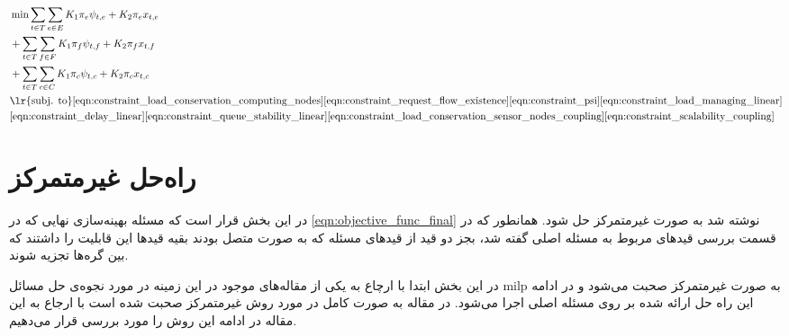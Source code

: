 	\begin{align}
		&\min \sum_{t \in T}\sum_{e \in E} K_1\pi_e\psi_{t,e}+K_2\pi_ex_{t,e}\notag \\
		&+\sum_{t \in T}\sum_{f \in F} K_1\pi_f\psi_{t,f}+K_2\pi_fx_{t,f}\notag \\
		&+\sum_{t \in T}\sum_{c \in C} K_1\pi_c\psi_{t,c}+K_2\pi_cx_{t,c} \label{eqn:objective_func_final} \notag \\
		&\text{\lr{subj. to}}  %
		\cref{eqn:constraint_load_conservation_computing_nodes}
		\cref{eqn:constraint_request_flow_existence}\cref{eqn:constraint_psi}
		\cref{eqn:constraint_load_managing_linear} \notag \\
		&\cref{eqn:constraint_delay_linear}
		\cref{eqn:constraint_queue_stability_linear}
		\cref{eqn:constraint_load_conservation_sensor_nodes_coupling}
		\cref{eqn:constraint_scalability_coupling}
	\end{align}
	\section{راه‌حل غیرمتمرکز}
	در این بخش قرار است که مسئله بهینه‌سازی نهایی که در \cref{eqn:objective_func_final} نوشته شد به صورت غیرمتمرکز حل شود. 
	همانطور که در قسمت بررسی قیدهای مربوط به مسئله اصلی گفته شد، بجز دو قید از قیدهای مسئله که به صورت متصل بودند بقیه قیدها این قابلیت را داشتند که بین گره‌ها تجزیه شوند. 
	
	در این بخش ابتدا با ارچاع به یکی از مقاله‌های موجود در این زمینه در مورد نجوه‌ی حل مسائل milp به صورت غیرمتمرکز صحبت می‌شود و در ادامه این راه حل ارائه شده بر روی مسئله اصلی اجرا می‌شود. 
	در مقاله \cite{decentralized_approach} به صورت کامل در مورد روش غیرمتمرکز صحبت شده است با ارجاع به این مقاله در ادامه این روش را مورد بررسی قرار می‌دهیم. 
	
